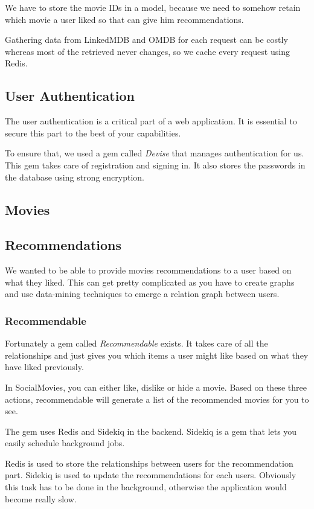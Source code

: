 \documentclass[12pt,a4paper]{article}
\begin{document}
We have to store the movie IDs in a model, because we need to somehow retain which movie a user liked so that can give him recommendations.

Gathering data from LinkedMDB and OMDB for each request can be costly whereas most of the retrieved never changes, so we cache every request using Redis.

\subsection{User Authentication}
The user authentication is a critical part of a web application. It is essential to secure this part to the best of your capabilities.

To ensure that, we used a gem called \textit{Devise} that manages authentication for us. This gem takes care of registration and signing in. It also stores the passwords in the database using strong encryption.

\subsection{Movies}
\subsection{Recommendations}
We wanted to be able to provide movies recommendations to a user based on what they liked. This can get pretty complicated as you have to create graphs and use data-mining techniques to emerge a relation graph between users.

\subsubsection{Recommendable}
Fortunately a gem called \textit{Recommendable} exists. It takes care of all the relationships and just gives you which items a user might like based on what they have liked previously.

In SocialMovies, you can either like, dislike or hide a movie. Based on these three actions, recommendable will generate a list of the recommended movies for you to see.

The gem uses Redis and Sidekiq in the backend. Sidekiq is a gem that lets you easily schedule background jobs.

Redis is used to store the relationships between users for the recommendation part. Sidekiq is used to update the recommendations for each users. Obviously this task has to be done in the background, otherwise the application would become really slow.
\end{document}
